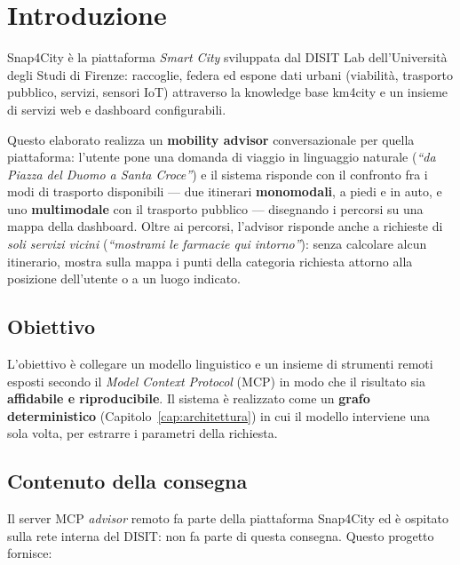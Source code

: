 \documentclass[a4paper,oneside]{Tptesi2}
\begin{document}
\mainmatter

\chapter{Introduzione}

Snap4City \`e la piattaforma \emph{Smart City} sviluppata dal DISIT Lab
dell'Universit\`a degli Studi di Firenze: raccoglie, federa ed espone dati urbani
(viabilit\`a, trasporto pubblico, servizi, sensori IoT) attraverso la knowledge base
km4city e un insieme di servizi web e dashboard configurabili.

Questo elaborato realizza un \textbf{mobility advisor} conversazionale per quella
piattaforma: l'utente pone una domanda di viaggio in linguaggio naturale
(\emph{``da Piazza del Duomo a Santa Croce''}) e il sistema risponde con il confronto
fra i modi di trasporto disponibili --- due itinerari \textbf{monomodali}, a piedi e in
auto, e uno \textbf{multimodale} con il trasporto pubblico --- disegnando i percorsi su
una mappa della dashboard. Oltre ai percorsi, l'advisor risponde anche a richieste di
\emph{soli servizi vicini} (\emph{``mostrami le farmacie qui intorno''}): senza calcolare
alcun itinerario, mostra sulla mappa i punti della categoria richiesta attorno alla
posizione dell'utente o a un luogo indicato.

\section{Obiettivo}

L'obiettivo \`e collegare un modello linguistico e un insieme di strumenti remoti
esposti secondo il \emph{Model Context Protocol} (MCP) in modo che il risultato sia
\textbf{affidabile e riproducibile}. Il sistema \`e realizzato come un \textbf{grafo
deterministico} (Capitolo~\ref{cap:architettura}) in cui il modello interviene una sola
volta, per estrarre i parametri della richiesta.

\section{Contenuto della consegna}

Il server MCP \emph{advisor} remoto fa parte della piattaforma Snap4City ed \`e ospitato
sulla rete interna del DISIT: non fa parte di questa consegna. Questo progetto fornisce:
\end{document}
